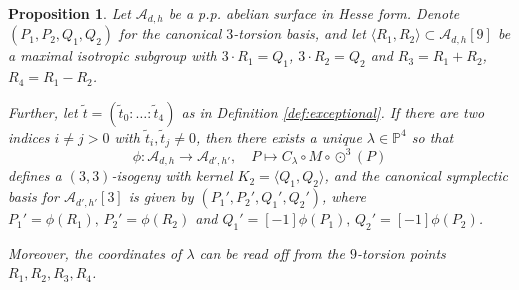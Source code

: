 \documentclass[11pt]{amsart}
\newtheorem{proposition}[theorem]{Proposition}
\theoremstyle{definition}
\newcommand{\A}{\mathcal{A}}
\newcommand{\PP}{\mathbb{P}}
\newcommand{\cube}{\odot^3}
\begin{document}
\begin{proposition} \label{prop:isogeny-formula-exceptional}
    Let $\A_{d,h}$ be a p.p. abelian surface in Hesse form. Denote $(P_1,P_2,Q_1,Q_2)$ for the canonical $3$-torsion basis, and let 
    \(
    \langle R_1,R_2\rangle \subset \A_{d,h}[9]
    \) be a maximal isotropic subgroup with $3 \cdot R_1  =  Q_1$, $3 \cdot R_2  =  Q_2$  and $R_3 = R_1 + R_2$, $R_4 = R_1 - R_2$. %
    
    Further, let $\tilde{t} = (\tilde{t}_0: \dots: \tilde{t}_4)$ as in Definition \ref{def:exceptional}. If there are two indices $i \neq j >0$ with $\tilde{t}_i, \tilde{t}_j \neq 0$, then there exists a unique $\lambda \in \PP^4$ so that 
    \[
    \phi: \A_{d,h} \to \A_{d',h'}, \quad P \mapsto C_\lambda \circ M \circ \cube(P)
    \]
    defines a $(3,3)$-isogeny with kernel $K_2 = \langle Q_1, Q_2\rangle$, and the canonical symplectic basis for $\A_{d',h'}[3]$ is given by  $(P_1',P_2',Q_1',Q_2')$, where $P_1' = \phi(R_1), \, P_2' = \phi(R_2)$ and $Q_1' = [-1]\phi(P_1), \, Q_2' = [-1]\phi(P_2)$. 
    
    Moreover, the coordinates of $\lambda$ can be read off from the $9$-torsion points $R_1,R_2,R_3,R_4$.
\end{proposition}
\end{document}
